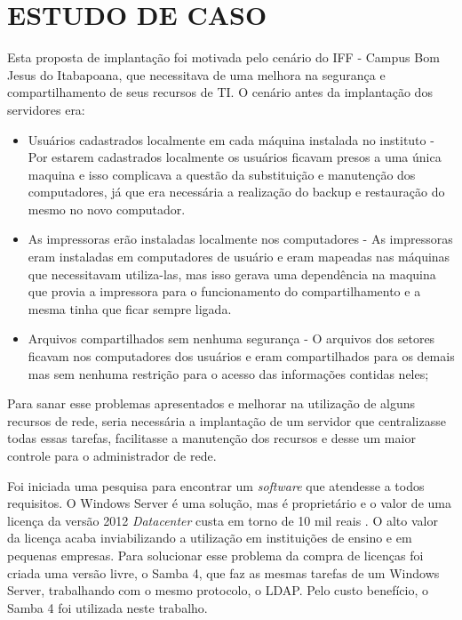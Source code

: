 \chapter{ESTUDO DE CASO}

Esta proposta de implantação foi motivada pelo cenário do IFF - Campus Bom Jesus do Itabapoana, que necessitava de uma melhora na segurança e compartilhamento de seus recursos de TI. O cenário antes da implantação dos servidores era:

\begin{itemize}
 	\item {Usuários cadastrados localmente em cada máquina instalada no instituto} - Por estarem cadastrados localmente os usuários ficavam presos a uma única maquina e isso complicava a questão da substituição e manutenção dos computadores, já que era necessária a realização do backup e restauração do mesmo no novo computador.
	\item {As impressoras erão instaladas localmente nos computadores} - As impressoras eram instaladas em computadores de usuário e eram mapeadas nas  máquinas que necessitavam utiliza-las, mas isso gerava uma dependência na maquina que provia a impressora para o funcionamento do compartilhamento e a mesma tinha que ficar sempre ligada.
	\item {Arquivos compartilhados sem nenhuma segurança} - O arquivos dos setores ficavam nos computadores dos usuários e eram compartilhados para os demais mas sem nenhuma restrição para o acesso das informações contidas neles;
\end{itemize}

 Para sanar esse problemas apresentados e melhorar na utilização de alguns recursos de rede, seria necessária a implantação de um servidor que centralizasse todas essas tarefas, facilitasse a manutenção dos recursos e desse um maior controle para o administrador de rede.

Foi iniciada uma pesquisa para encontrar um \textit{software} que atendesse a todos requisitos. O Windows Server é uma solução, mas é proprietário e o valor de uma licença da versão 2012 \textit{Datacenter} custa em torno de 10 mil reais \cite{SERVER}. O alto valor da licença acaba inviabilizando a utilização em instituições de ensino e em pequenas empresas. 
Para solucionar esse problema da compra de licenças foi criada uma versão livre, o Samba 4, que faz as mesmas tarefas de um Windows Server, trabalhando com o mesmo protocolo, o LDAP. Pelo custo benefício, o Samba 4 foi utilizada neste trabalho.

